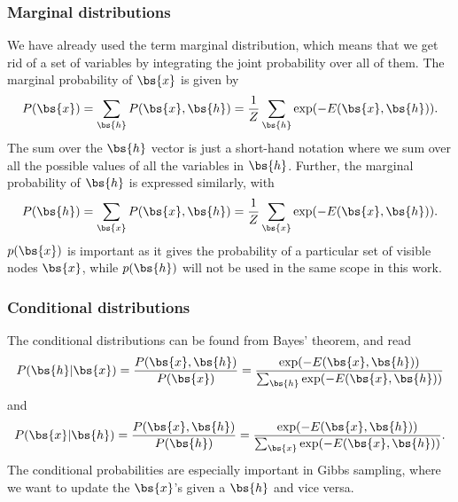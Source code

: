 \subsubsection{Marginal distributions}
We have already used the term marginal distribution, which means that we get rid of a set of variables by integrating the joint probability over all of them. The marginal probability of $\bs{x}$ is given by
\begin{equation}
P(\bs{x})=\sum_{\bs{h}}P(\bs{x},\bs{h})=\frac{1}{Z}\sum_{\bs{h}}\exp(-E(\bs{x},\bs{h})).
\end{equation}
The sum over the $\bs{h}$ vector is just a short-hand notation where we sum over all the possible values of all the variables in $\bs{h}$. Further, the marginal probability of $\bs{h}$ is expressed similarly, with
\begin{equation}
P(\bs{h})=\sum_{\bs{x}}P(\bs{x},\bs{h})=\frac{1}{Z}\sum_{\bs{x}}\exp(-E(\bs{x},\bs{h})).
\end{equation}
$p(\bs{x})$ is important as it gives the probability of a particular set of visible nodes $\bs{x}$, while $p(\bs{h})$ will not be used in the same scope in this work. 

\subsubsection{Conditional distributions}
The conditional distributions can be found from Bayes' theorem, and read
\begin{equation}
P(\bs{h}|\bs{x})=\frac{P(\bs{x},\bs{h})}{P(\bs{x})}=\frac{\exp(-E(\bs{x},\bs{h}))}{\sum_{\bs{h}}\exp(-E(\bs{x},\bs{h}))}
\end{equation}
and
\begin{equation}
P(\bs{x}|\bs{h})=\frac{P(\bs{x},\bs{h})}{P(\bs{h})}=\frac{\exp(-E(\bs{x},\bs{h}))}{\sum_{\bs{x}}\exp(-E(\bs{x},\bs{h}))}.
\end{equation}
The conditional probabilities are especially important in Gibbs sampling, where we want to update the $\bs{x}$'s given a $\bs{h}$ and vice versa. 

